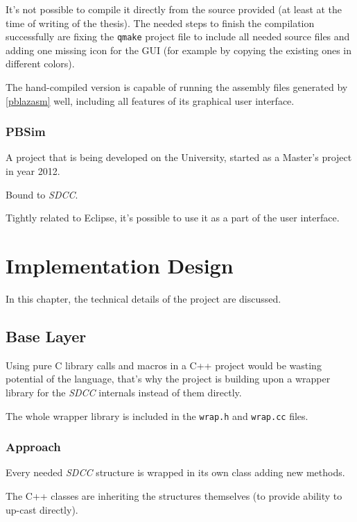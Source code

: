             It's not possible to compile it directly from the source provided (at least at the time of writing of the thesis). The needed steps to finish the compilation successfully are fixing the \texttt{qmake} project file to include all needed source files and adding one missing icon for the GUI (for example by copying the existing ones in different colors).

            The hand-compiled version is capable of running the assembly files generated by \ref{pblazasm} well, including all features of its graphical user interface.

        \subsection{PBSim}\label{pbsim}

        A project that is being developed on the University, started as a Master's project in year 2012.

        Bound to \emph{SDCC}.

        Tightly related to Eclipse, it's possible to use it as a part of the user interface.

        


\chapter{Implementation Design}\label{design}

In this chapter, the technical details of the project are discussed.

\section{Base Layer}

Using pure C library calls and macros in a C++ project would be wasting potential of the language, that's why the project is building upon a wrapper library for the \emph{SDCC} internals instead of them directly.

The whole wrapper library is included in the \texttt{wrap.h} and \texttt{wrap.cc} files.

    \subsection{Approach}

    Every needed \emph{SDCC} structure is wrapped in its own class adding new methods.

    The C++ classes are inheriting the structures themselves (to provide ability to up-cast directly).

